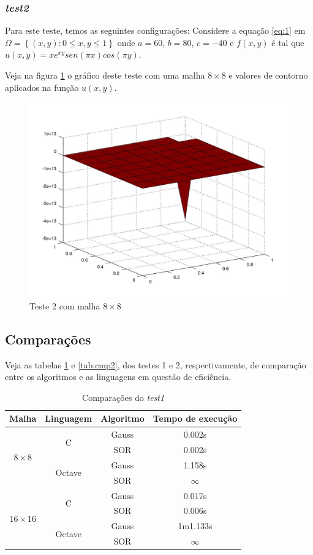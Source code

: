 \documentclass[
	11pt,				%
	oneside,			%
	a4paper,			%
	english,			%
	brazil,				%
	]{article}
\begin{document}
\subsubsection{\textit{test2}}
Para este teste, temos as seguintes configurações: Considere a equação \eqref{eq:1} em $ \Omega = \left\{(x,y) : 0 \le x,y \le 1\right\} $ onde $a = 60$, $b = 80$, $c = -40$ e $f(x,y)$ é tal que $u(x,y) = xe^{xy}sen(\pi x)cos(\pi y)$.

Veja na figura \ref{fig:2} o gráfico deste teste com uma malha $8\times8$ e valores de contorno aplicados na função $u(x,y)$.

\begin{figure}[h]
\includegraphics[width=\textwidth]{outros-8x8.jpg}
\centering
\caption{Teste 2 com malha $8\times8$}
\label{fig:2}
\end{figure}

\subsection{Comparações}
Veja as tabelas \ref{tab:cmp1} e \ref{tab:cmp2}, dos testes 1 e 2, respectivamente, de comparação entre os algoritmos e as linguagens em questão de eficiência.

\begin{table}[ht]
\centering
\begin{tabular}{cccc}
\hline 
\textbf{Malha} & \textbf{Linguagem} & \textbf{Algoritmo} & \textbf{Tempo de execução} \\
\hline
\multirow{4}{*}{\textit{$8 \times 8$}} & \multirow{2}{*}{C}  & Gauss & 0.002s  \\ 
& & SOR & 0.002s  \\
& \multirow{2}{*}{Octave} & Gauss & 1.158s  \\
& & SOR & $\infty$ \\
\hline
\multirow{4}{*}{\textit{$16 \times 16$}} & \multirow{2}{*}{C} & Gauss & 0.017s  \\ 
& & SOR & 0.006s  \\
& \multirow{2}{*}{Octave} & Gauss & 1m1.133s  \\
& & SOR & $\infty$ \\
\hline
\end{tabular}
\caption{Comparações do \textit{test1}}
\label{tab:cmp1}
\end{table}
\end{document}
